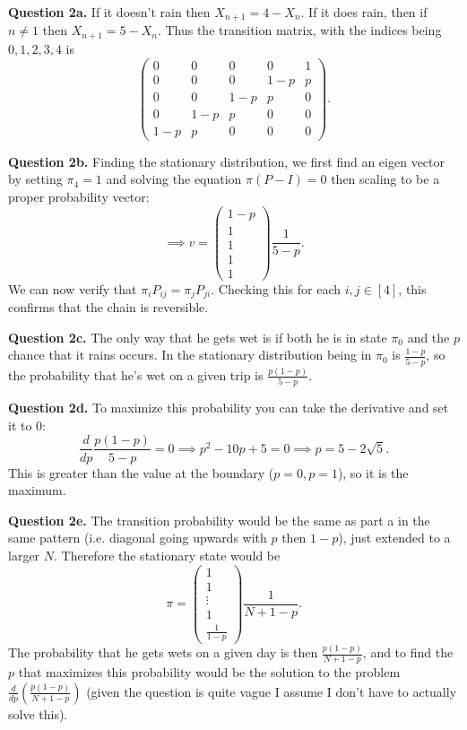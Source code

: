 \documentclass[letterpaper, reqno,11pt]{article}
\begin{document}
{\medskip\noindent\bf Question 2a.} If it doesn't rain then $X_{n+1}=4-X_{n}$. If it does rain, then if $n\neq 1$ then $X_{n+1}=5-X_n$. Thus the transition matrix, with the indices being $0,1,2,3,4$ is
\[
\begin{pmatrix} 
    0&0&0&0&1\\
    0&0&0&1-p&p\\
    0&0&1-p&p&0\\
    0&1-p&p&0&0\\
    1-p&p&0&0&0
\end{pmatrix} 
.\]

{\medskip\noindent\bf Question 2b.} Finding the stationary distribution, we first find an eigen vector by setting $\pi_4=1$ and solving the equation $\pi(P-I)=0$ then scaling to be a proper probability vector:
\[
\implies v=\begin{pmatrix} 1-p\\ 1\\ 1\\ 1\\ 1 \end{pmatrix}\frac{1}{5-p}
.\]
We can now verify that $\pi_i P_{ij}=\pi_j P_{ji}$. Checking this for each $i,j\in [4]$, this confirms that the chain is reversible.

{\medskip\noindent\bf Question 2c.} The only way that he gets wet is if both he is in state $\pi_0$ and the $p$ chance that it rains occurs. In the stationary distribution being in $\pi_0$ is $\frac{1-p}{5-p}$, so the probability that he's wet on a given trip is $\frac{p(1-p)}{5-p}$.

{\medskip\noindent\bf Question 2d.} To maximize this probability you can take the derivative and set it to 0: 
\[
\frac{d}{dp}\frac{p(1-p)}{5-p}=0\implies p^2-10p+5=0\implies p=5-2\sqrt{5} 
.\]
This is greater than the value at the boundary ($p=0,p=1$), so it is the maximum.

{\medskip\noindent\bf Question 2e.} The transition probability would be the same as part a in the same pattern (i.e. diagonal going upwards with $p$ then $1-p$), just extended to a larger $N$. Therefore the stationary state would be
\[
\pi= \begin{pmatrix} 1\\1\\ \vdots \\ 1\\ \frac{1}{1-p}\end{pmatrix}\frac{1}{N+1-p}
.\]
The probability that he gets wets on a given day is then $\frac{p(1-p)}{N+1-p}$, and to find the $p$ that maximizes this probability would be the solution to the problem $\frac{d}{dp}\left( \frac{p(1-p)}{N+1-p} \right) $ (given the question is quite vague I assume I don't have to actually solve this).
\end{document}

